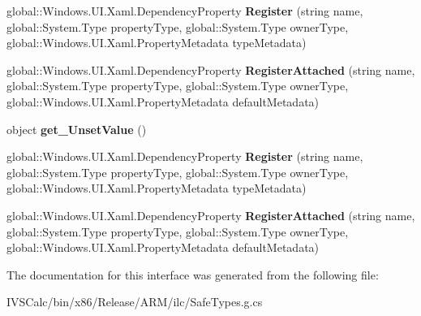 \begin{DoxyCompactItemize}
global\+::\+Windows.\+U\+I.\+Xaml.\+Dependency\+Property {\bfseries Register} (string name, global\+::\+System.\+Type property\+Type, global\+::\+System.\+Type owner\+Type, global\+::\+Windows.\+U\+I.\+Xaml.\+Property\+Metadata type\+Metadata)
\item 
\mbox{\label{interface_windows_1_1_u_i_1_1_xaml_1_1_i_dependency_property_statics_ae43bcad9ef0a0efab0a70609013e7b53}} 
global\+::\+Windows.\+U\+I.\+Xaml.\+Dependency\+Property {\bfseries Register\+Attached} (string name, global\+::\+System.\+Type property\+Type, global\+::\+System.\+Type owner\+Type, global\+::\+Windows.\+U\+I.\+Xaml.\+Property\+Metadata default\+Metadata)
\item 
\mbox{\label{interface_windows_1_1_u_i_1_1_xaml_1_1_i_dependency_property_statics_aa28828abf71475e63362031e6a61c8fa}} 
object {\bfseries get\+\_\+\+Unset\+Value} ()
\item 
\mbox{\label{interface_windows_1_1_u_i_1_1_xaml_1_1_i_dependency_property_statics_a4e706c1d69fb6429a9f6fe61c7780e79}} 
global\+::\+Windows.\+U\+I.\+Xaml.\+Dependency\+Property {\bfseries Register} (string name, global\+::\+System.\+Type property\+Type, global\+::\+System.\+Type owner\+Type, global\+::\+Windows.\+U\+I.\+Xaml.\+Property\+Metadata type\+Metadata)
\item 
\mbox{\label{interface_windows_1_1_u_i_1_1_xaml_1_1_i_dependency_property_statics_ae43bcad9ef0a0efab0a70609013e7b53}} 
global\+::\+Windows.\+U\+I.\+Xaml.\+Dependency\+Property {\bfseries Register\+Attached} (string name, global\+::\+System.\+Type property\+Type, global\+::\+System.\+Type owner\+Type, global\+::\+Windows.\+U\+I.\+Xaml.\+Property\+Metadata default\+Metadata)
\end{DoxyCompactItemize}


The documentation for this interface was generated from the following file\+:\begin{DoxyCompactItemize}
\item 
I\+V\+S\+Calc/bin/x86/\+Release/\+A\+R\+M/ilc/Safe\+Types.\+g.\+cs\end{DoxyCompactItemize}
